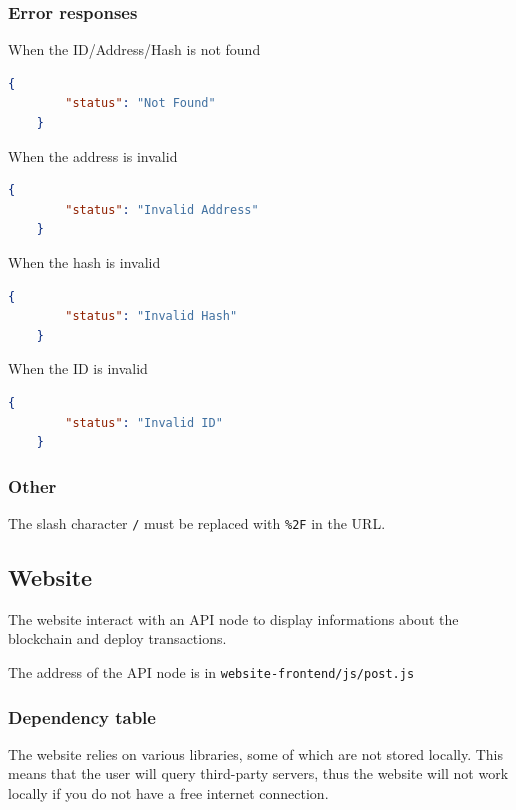 \documentclass[../documentation.tex]{subfiles}
\begin{document}
\subsubsection{Error responses}

When the ID/Address/Hash is not found

\begin{lstlisting}[language=json]
    {
        "status": "Not Found"
    }
\end{lstlisting}

When the address is invalid

\begin{lstlisting}[language=json]
    {
        "status": "Invalid Address"
    }
\end{lstlisting}

When the hash is invalid

\begin{lstlisting}[language=json]
    {
        "status": "Invalid Hash"
    }
\end{lstlisting}

When the ID is invalid

\begin{lstlisting}[language=json]
    {
        "status": "Invalid ID"
    }
\end{lstlisting}

\subsubsection{Other}

The slash character \texttt{/} must be replaced with \texttt{\%2F} in the URL.

\pagebreak

\subsection{Website}

The website interact with an API node to display informations about the blockchain
and deploy transactions.

The address of the API node is in \texttt{website-frontend/js/post.js}

\subsubsection{Dependency table}

The website relies on various libraries, some of which are not stored locally.
This means that the user will query third-party servers, thus the website will not work
locally if you do not have a free internet connection.
\end{document}
